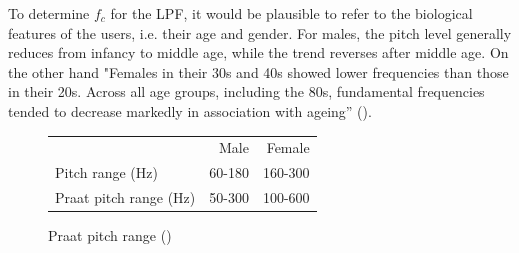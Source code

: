To determine $f_c$ for the LPF, it would be plausible to refer to the biological features of the users, i.e. their age and gender.
For males, the pitch level generally reduces from infancy to middle age, while the trend reverses after middle age. 
On the other hand "Females in their 30s and 40s showed lower frequencies than those in their 20s. Across all age groups, including the 80s, fundamental frequencies tended to decrease markedly in association with ageing” (\cite{womenprange}).


\begin{figure}
    \CenterFloatBoxes
    \begin{floatrow}
        \killfloatstyle
        \ttabbox
            {\begin{tabular}{lrr}		& Male   & Female  \\
			    Pitch range (Hz)            & 60-180 & 160-300 \\
			    Praat pitch range (Hz) 		& 50-300 & 100-600
		    \end{tabular}
            }{
            \label{table:praat}
            \caption{Praat pitch range (\cite{lifespan})}
            }
    \end{floatrow}
\end{figure}

